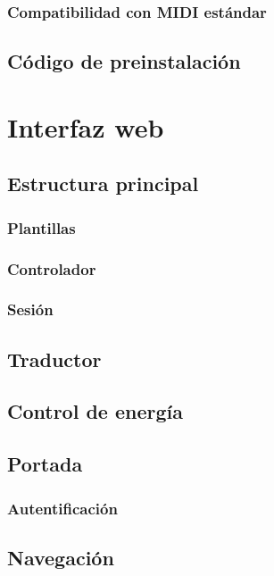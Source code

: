 \subsubsection{Compatibilidad con MIDI estándar}

\subsection{Código de preinstalación}

\section{Interfaz web}

\subsection{Estructura principal}
\subsubsection{Plantillas}
\subsubsection{Controlador}
\subsubsection{Sesión}

\subsection{Traductor}

\subsection{Control de energía}

\subsection{Portada}
\subsubsection{Autentificación}

\subsection{Navegación}

